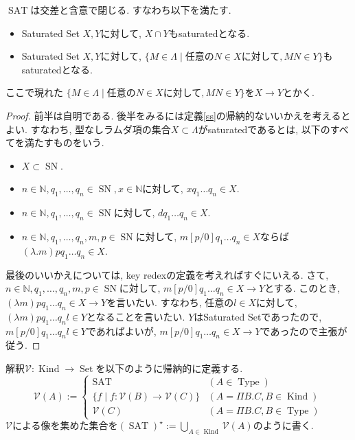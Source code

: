 \documentclass[12pt, titlepage]{ltjsarticle}
\DeclareMathOperator{\SN}{SN}
\DeclareMathOperator{\Type}{Type}
\DeclareMathOperator{\Kind}{Kind}
\DeclareMathOperator{\SAT}{SAT}
\DeclareMathOperator{\Set}{Set}
\begin{document}
\begin{lem}
 $\SAT$は交差と含意で閉じる. すなわち以下を満たす.
 \begin{itemize}
  \item Saturated Set $X, Y$に対して, $X \cap Y$もsaturatedとなる.
  \item Saturated Set $X, Y$に対して, $\{ M \in \Lambda \mid \text{任意の} N \in X \text{に対して}, M N \in Y\}$もsaturatedとなる.
 \end{itemize}
 ここで現れた $\{ M \in \Lambda \mid \text{任意の} N \in X \text{に対して}, M N \in Y\}$を$X \rightarrow Y$とかく.
\end{lem}
\begin{proof}
 前半は自明である.
 後半をみるには定義\ref{ss}の帰納的ないいかえを考えるとよい. すなわち,
 型なしラムダ項の集合$X \subset \Lambda$がsaturatedであるとは, 以下のすべてを満たすものをいう.
 \begin{itemize}
  \item $X \subset \SN$.
  \item $n \in \mathbb{N}, q_1, \ldots, q_n \in \SN, x \in \mathbb{N}$に対して, $x q_1 \ldots q_n \in X$.
  \item $n \in \mathbb{N}, q_1, \ldots, q_n \in \SN$に対して, $d q_1 \ldots q_n \in X$.
  \item $n \in \mathbb{N}, q_1, \ldots, q_n, m, p \in \SN$に対して, $m[p/0]q_1 \ldots q_n \in X$ならば$(\lambda . m)p q_1 \ldots q_n \in X$.
 \end{itemize}
最後のいいかえについては, key redexの定義を考えればすぐにいえる.
さて, $n \in \mathbb{N}, q_1, \ldots, q_n, m, p \in \SN$に対して, $m[p/0]q_1 \ldots q_n \in X \rightarrow Y$とする. このとき, $(\lambda m)p q_1 \ldots q_n \in X \rightarrow Y$を言いたい.
すなわち, 任意の$l \in X$に対して, $(\lambda m)p q_1 \ldots q_n l \in Y$となることを言いたい.
 $Y$はSaturated Setであったので, $m[p/0] q_1 \ldots q_n l \in Y$であればよいが, $m[p/0]q_1 \ldots q_n \in X \rightarrow Y$であったので主張が従う.
\end{proof}

\begin{defn}
 解釈$\mathcal{V} : \Kind \rightarrow \Set$を以下のように帰納的に定義する.
\[
  \mathcal{V} (A) := \begin{cases}
    \SAT & (A \in \Type) \\
    \{ f \mid f : \mathcal{V}(B) \rightarrow \mathcal{V}(C) \} & (A = \Pi B. C, B \in \Kind) \\
    \mathcal{V} (C) & (A = \Pi B. C, B \in \Type)
  \end{cases}
\]
 $\mathcal{V}$による像を集めた集合を$(\SAT)^\star := \bigcup_{A \in \Kind} \mathcal{V}(A)$のように書く.
\end{defn}
\end{document}
